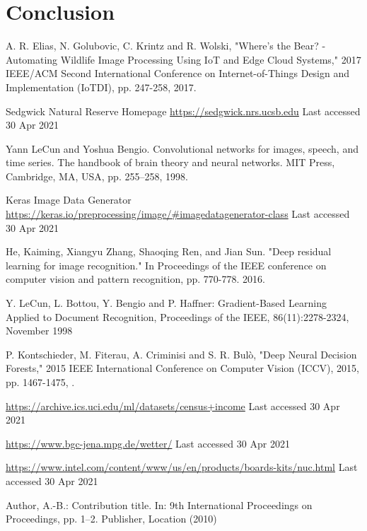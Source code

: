 \documentclass[runningheads]{llncs}
\begin{document}
\section{Conclusion}
\label{spt:conclusion}



%
%
%

% 
% 

\begin{thebibliography}{8}

A. R. Elias, N. Golubovic, C. Krintz and R. Wolski, "Where's the Bear? - Automating Wildlife Image Processing Using IoT and Edge Cloud Systems," 2017 IEEE/ACM Second International Conference on Internet-of-Things Design and Implementation (IoTDI), pp. 247-258, 2017.

Sedgwick Natural Reserve Homepage \url{https://sedgwick.nrs.ucsb.edu} Last accessed 30 Apr 2021

Yann LeCun and Yoshua Bengio. Convolutional networks for images, speech, and time series. The handbook of brain theory and neural networks. MIT Press, Cambridge, MA, USA, pp. 255–258, 1998.

Keras Image Data Generator \url{https://keras.io/preprocessing/image/\#imagedatagenerator-class} Last accessed 30 Apr 2021

He, Kaiming, Xiangyu Zhang, Shaoqing Ren, and Jian Sun. "Deep residual learning for image recognition." In Proceedings of the IEEE conference on computer vision and pattern recognition, pp. 770-778. 2016.

Y. LeCun, L. Bottou, Y. Bengio and P. Haffner: Gradient-Based Learning Applied to Document Recognition, Proceedings of the IEEE, 86(11):2278-2324, November 1998

P. Kontschieder, M. Fiterau, A. Criminisi and S. R. Bulò, "Deep Neural Decision Forests," 2015 IEEE International Conference on Computer Vision (ICCV), 2015, pp. 1467-1475, .

\url{https://archive.ics.uci.edu/ml/datasets/census+income} Last accessed 30 Apr 2021

\url{https://www.bgc-jena.mpg.de/wetter/} Last accessed 30 Apr 2021 

\url{https://www.intel.com/content/www/us/en/products/boards-kits/nuc.html} Last accessed 30 Apr 2021 


Author, A.-B.: Contribution title. In: 9th International Proceedings
on Proceedings, pp. 1--2. Publisher, Location (2010)

\end{thebibliography}
\end{document}
